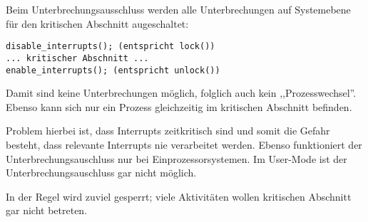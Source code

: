 \begin{answer}
Beim Unterbrechungsausschluss werden alle Unterbrechungen auf Systemebene für den kritischen Abschnitt augeschaltet:

\begin{verbatim}
disable_interrupts(); (entspricht lock())
... kritischer Abschnitt ...
enable_interrupts(); (entspricht unlock())
\end{verbatim}

Damit sind keine Unterbrechungen möglich, folglich auch kein ,,Prozesswechsel''. Ebenso kann sich nur ein Prozess gleichzeitig im kritischen Abschnitt befinden.

Problem hierbei ist, dass Interrupts zeitkritisch sind und somit die Gefahr besteht, dass relevante Interrupts nie verarbeitet werden. Ebenso funktioniert der Unterbrechungsauschluss nur bei Einprozessorsystemen. Im User-Mode ist der Unterbrechungsauschluss gar nicht möglich.

In der Regel wird zuviel gesperrt; viele Aktivitäten wollen kritischen Abschnitt gar nicht betreten.
\end{answer}

